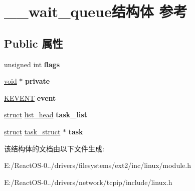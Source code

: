 \hypertarget{struct____wait__queue}{}\section{\+\_\+\+\_\+wait\+\_\+queue结构体 参考}
\label{struct____wait__queue}
\subsection*{Public 属性}
\begin{DoxyCompactItemize}
\item 
\mbox{\label{struct____wait__queue_a503b31e293fdf01b87763750d3dc8706}} 
unsigned int {\bfseries flags}
\item 
\mbox{\label{struct____wait__queue_a0cc2b779575851a1b4429b7af65c7bd8}} 
\hyperlink{interfacevoid}{void} $\ast$ {\bfseries private}
\item 
\mbox{\label{struct____wait__queue_ad37d6689f0b45696d321d39d7502dcf0}} 
\hyperlink{struct___k_e_v_e_n_t}{K\+E\+V\+E\+NT} {\bfseries event}
\item 
\mbox{\label{struct____wait__queue_a6a86d788f9ce48eef41634325b6ccc97}} 
\hyperlink{interfacestruct}{struct} \hyperlink{structlist__head}{list\+\_\+head} {\bfseries task\+\_\+list}
\item 
\mbox{\label{struct____wait__queue_ad48bb912039a0050b66c55c9ac6af30a}} 
\hyperlink{interfacestruct}{struct} \hyperlink{structtask__struct}{task\+\_\+struct} $\ast$ {\bfseries task}
\end{DoxyCompactItemize}


该结构体的文档由以下文件生成\+:\begin{DoxyCompactItemize}
\item 
E\+:/\+React\+O\+S-\/0../drivers/filesystems/ext2/inc/linux/module.\+h\item 
E\+:/\+React\+O\+S-\/0../drivers/network/tcpip/include/linux.\+h\end{DoxyCompactItemize}
